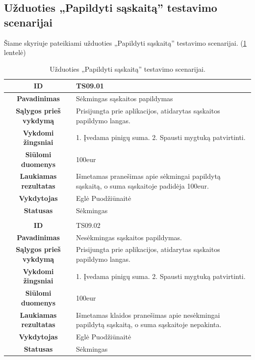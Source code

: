 \documentclass{VUMIFPSkursinis}
\begin{document}
	\subsection{Užduoties „Papildyti sąskaitą” testavimo scenarijai}
	Šiame skyriuje pateikiami užduoties „Papildyti sąskaitą” testavimo scenarijai. (\ref{papildymas} lentelė)
	\begin{table}[H]
		\caption{Užduoties „Papildyti sąskaitą” testavimo scenarijai.}
		\begin{tabular}{|p{6cm}|p{11cm}|}
			\hline
			\multicolumn{1}{|c|}{{\bfseries ID}}&
			{TS09.01}\\
			\hline
			\multicolumn{1}{|c|}{{\bfseries Pavadinimas}}&
			{Sėkmingas sąskaitos papildymas}\\
			\hline
			\multicolumn{1}{|c|}{{\bfseries Sąlygos prieš vykdymą}}&
			{Prisijungta prie aplikacijos, atidarytas sąskaitos papildymo langas.}\\
			\hline
			\multicolumn{1}{|c|}{{\bfseries Vykdomi žingsniai}}&
			{1. Įvedama pinigų suma.
				2. Spausti mygtuką patvirtinti.}\\
			\hline
			\multicolumn{1}{|c|}{{\bfseries Siūlomi duomenys}}&
			{100eur}\\
			\hline
			\multicolumn{1}{|c|}{{\bfseries Laukiamas rezultatas}}&
			{Išmetamas pranešimas apie sėkmingai papildytą sąskaitą, o suma sąskaitoje padidėja 100eur.}\\
			\hline
			\multicolumn{1}{|c|}{{\bfseries Vykdytojas}}&
			{Eglė Puodžiūnaitė}\\
			\hline
			\multicolumn{1}{|c|}{{\bfseries Statusas}}&
			{Sėkmingas}\\
			\hline
			\rowcolor{lightgray}
			\multicolumn{2}{|c|}{}\\
			\hline				
			\multicolumn{1}{|c|}{{\bfseries ID}}&
			{TS09.02}\\
			\hline
			\multicolumn{1}{|c|}{{\bfseries Pavadinimas}}&
			{Nesėkmingas sąskaitos papildymas.}\\
			\hline
			\multicolumn{1}{|c|}{{\bfseries Sąlygos prieš vykdymą}}&
			{Prisijungta prie aplikacijos, atidarytas sąskaitos papildymo langas.}\\
			\hline
			\multicolumn{1}{|c|}{{\bfseries Vykdomi žingsniai}}&
			{1. Įvedama pinigų suma.
				2. Spausti mygtuką patvirtinti.}\\
			\hline
			\multicolumn{1}{|c|}{{\bfseries Siūlomi duomenys}}&
			{100eur}\\
			\hline
			\multicolumn{1}{|c|}{{\bfseries Laukiamas rezultatas}}&
			{Išmetamas klaidos pranešimas apie nesėkmingai papildytą sąskaitą, o suma sąskaitoje nepakinta.}\\
			\hline
			\multicolumn{1}{|c|}{{\bfseries Vykdytojas}}&
			{Eglė Puodžiūnaitė}\\
			\hline
			\multicolumn{1}{|c|}{{\bfseries Statusas}}&
			{Sėkmingas}\\
			\hline		
		\end{tabular}
		\label{papildymas}
	\end{table}	
	
\end{document}
